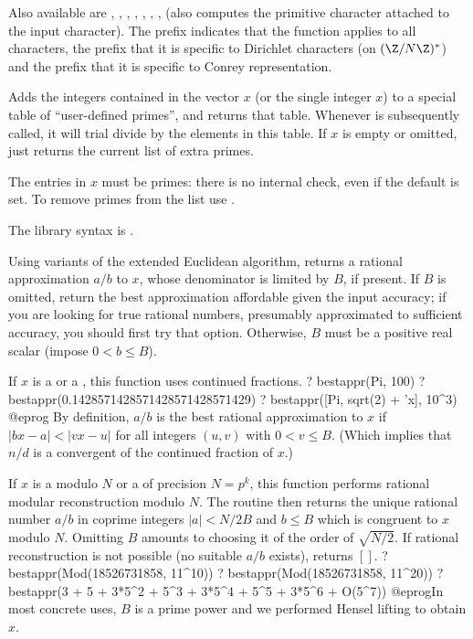 Also available are ,  , ,
, , , ,
 (also computes the primitive character attached to
the input character). The prefix  indicates that the function
applies to all characters, the prefix  that it is specific to
Dirichlet characters (on $(\Z/N\Z)^*$) and the prefix  that it
is specific to Conrey representation.

\bigskip


\label{se:addprimes}
Adds the integers contained in the
vector $x$ (or the single integer $x$) to a special table of
``user-defined primes'', and returns that table. Whenever  is
subsequently called, it will trial divide by the elements in this table.
If $x$ is empty or omitted, just returns the current list of extra
primes.

The entries in $x$ must be primes: there is no internal check, even if
the  default is set. To remove primes from the list use
.

The library syntax is .

\label{se:bestappr}
Using variants of the extended Euclidean algorithm, returns a rational
approximation $a/b$ to $x$, whose denominator is limited
by $B$, if present. If $B$ is omitted, return the best approximation
affordable given the input accuracy; if you are looking for true rational
numbers, presumably approximated to sufficient accuracy, you should first
try that option. Otherwise, $B$ must be a positive real scalar (impose
$0 < b \leq B$).

\item If $x$ is a  or a , this function uses continued
fractions.
\bprog
? bestappr(Pi, 100)
? bestappr(0.1428571428571428571428571429)
? bestappr([Pi, sqrt(2) + 'x], 10^3)
@eprog
By definition, $a/b$ is the best rational approximation to $x$ if
$|b x - a| < |v x - u|$ for all integers $(u,v)$ with $0 < v \leq B$.
(Which implies that $n/d$ is a convergent of the continued fraction of $x$.)

\item If $x$ is a  modulo $N$ or a  of precision $N =
p^k$, this function performs rational modular reconstruction modulo $N$. The
routine then returns the unique rational number $a/b$ in coprime integers
$|a| < N/2B$ and $b\leq B$ which is congruent to $x$ modulo $N$. Omitting
$B$ amounts to choosing it of the order of $\sqrt{N/2}$. If rational
reconstruction is not possible (no suitable $a/b$ exists), returns $[]$.
\bprog
? bestappr(Mod(18526731858, 11^10))
? bestappr(Mod(18526731858, 11^20))
? bestappr(3 + 5 + 3*5^2 + 5^3 + 3*5^4 + 5^5 + 3*5^6 + O(5^7))
@eprog\noindent In most concrete uses, $B$ is a prime power and we performed
Hensel lifting to obtain $x$.

